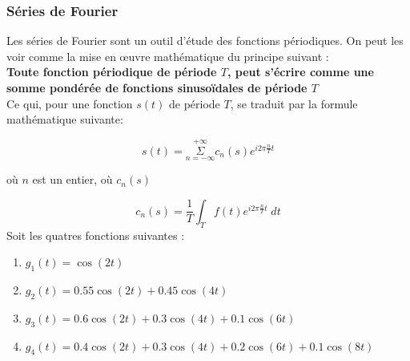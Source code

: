 \documentclass[11pt,a4paper]{article}
\begin{document}
\subsubsection{Séries de Fourier}
Les séries de Fourier sont un outil d'étude des fonctions périodiques. On peut les voir comme la mise en œuvre mathématique du principe suivant :\\

\textbf{Toute fonction périodique de période $T$, peut s'écrire comme une somme pondérée de fonctions sinusoïdales de période $T$}\\

Ce qui, pour une fonction $s(t)$ de période $T$, se traduit par la formule mathématique suivante: 

\[ s(t) = \overset{+\infty}{\underset{n = -\infty}{ \Sigma}} c_n(s)e^{i 2\pi \frac{n}{T}t}\]

où $n$ est un entier, où $c_n(s)$

\[ c_n(s) = \frac{1}{T} \int_{T} f(t)e^{i 2\pi \frac{n}{T}t} \; dt \]
Soit les quatres fonctions suivantes : 
\begin{enumerate}
\item $g_1(t) = \cos(2 t)$
\item $g_2(t) = 0.55 \cos(2 t) + 0.45 \cos(4 t)$
\item $g_3(t) = 0.6 \cos(2 t) + 0.3 \cos(4 t) + 0.1 \cos(6 t)$
\item $g_4(t) = 0.4 \cos(2 t) + 0.3 \cos(4 t) + 0.2 \cos(6 t) + 0.1 \cos(8 t) $
\end{enumerate}

\begin{center}
\end{center}
\end{document}
